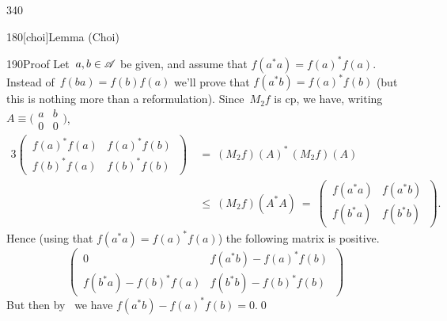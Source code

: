 \begin{parsec}{340}
\begin{point}{180}[choi]{Lemma (Choi\cite{choi})}
\begin{point}{190}{Proof}
Let~$a,b\in \mathscr{A}$ be given,
and assume that $f(a^*a)=f(a)^*f(a)$.
Instead of~$f(ba)=f(b)f(a)$
we'll prove that $f(a^*b)=f(a)^*f(b)$
(but this is nothing more than  a reformulation).
Since~$M_2f$ is cp,
we have, writing 
$A\equiv\bigl(\begin{smallmatrix}a&b\\0&0\end{smallmatrix}\bigr)$,
\begin{alignat*}{3}
\left(\,\begin{matrix}f(a)^*f(a)&f(a)^*f(b)\\
f(b)^*f(a)&f(b)^*f(b)\end{matrix}\,\right) 
	\ &=\ (M_2f)(A)^*\,(M_2f)(A)\\
\ &\leq\ (M_2f)(A^*A) \ =\ 
\left(\,\begin{matrix}f(a^*a)&f(a^*b)\\
f(b^*a)&f(b^*b)\end{matrix}\,\right).
\end{alignat*}
Hence
(using that $f(a^*a)=f(a)^*f(a)$)
the following matrix is positive.
\begin{equation*}
\left(\,\begin{matrix}
0 & f(a^*b) - f(a)^*f(b) \\
f(b^*a)-f(b)^*f(a) & f(b^*b)-f(b)^*f(b)
\end{matrix}\,\right)
\end{equation*}
But then
by~
we have
$f(a^*b)-f(a)^*f(b)=0$.\qed
\end{point}
\end{point}
\end{parsec}

